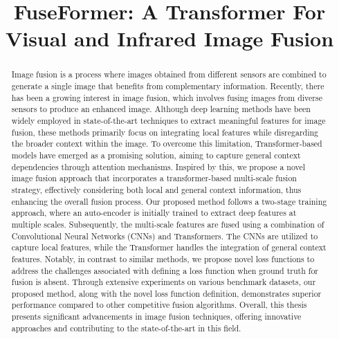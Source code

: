 \documentclass[conference]{IEEEtran}
\begin{document}
\title{FuseFormer: A Transformer For Visual and Infrared Image Fusion\\
}

\author{
\and
{}
}

\maketitle

\begin{abstract}
Image fusion is a process where images obtained from different sensors are combined to generate a single image that benefits from complementary information. Recently, there has been a growing interest in image fusion, which involves fusing images from diverse sensors to produce an enhanced image. Although deep learning methods have been widely employed in state-of-the-art techniques to extract meaningful features for image fusion, these methods primarily focus on integrating local features while disregarding the broader context within the image. To overcome this limitation, Transformer-based models have emerged as a promising solution, aiming to capture general context dependencies through attention mechanisms. Inspired by this, we propose a novel image fusion approach that incorporates a transformer-based multi-scale fusion strategy, effectively considering both local and general context information, thus enhancing the overall fusion process. Our proposed method follows a two-stage training approach, where an auto-encoder is initially trained to extract deep features at multiple scales. Subsequently, the multi-scale features are fused using a combination of Convolutional Neural Networks (CNNs) and Transformers. The CNNs are utilized to capture local features, while the Transformer handles the integration of general context features. Notably, in contrast to similar methods, we propose novel loss functions to address the challenges associated with defining a loss function when ground truth for fusion is absent. Through extensive experiments on various benchmark datasets, our proposed method, along with the novel loss function definition, demonstrates superior performance compared to other competitive fusion algorithms. Overall, this thesis presents significant advancements in image fusion techniques, offering innovative approaches and contributing to the state-of-the-art in this field.
\end{abstract}
\end{document}
